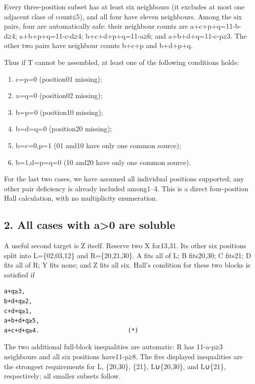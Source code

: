 \documentclass[
  10pt,
]{article}
\providecommand{\tightlist}{%
  \setlength{\itemsep}{0pt}\setlength{\parskip}{0pt}}
\begin{document}
Every three-position subset has at least six neighbours (it excludes at
most one adjacent class of count≤5), and all four have eleven
neighbours. Among the six pairs, four are automatically safe: their
neighbour counts are a+c+p+q=11-b-d≥4; a+b+p+q=11-c-d≥4;
b+c+d+p+q=11-a≥6; and a+b+d+q=11-c-p≥3. The other two pairs have
neighbour counts b+c+p and b+d+p+q.

Thus if T cannot be assembled, at least one of the following conditions
holds:

\begin{enumerate}
\def\labelenumi{\arabic{enumi}.}
\tightlist
\item
  c=p=0 (position01 missing);
\item
  a=q=0 (position02 missing);
\item
  b=p=0 (position10 missing);
\item
  b=d=q=0 (position20 missing);
\item
  b=c=0,p=1 (01 and10 have only one common source);
\item
  b=1,d=p=q=0 (10 and20 have only one common source).
\end{enumerate}

For the last two cases, we have assumed all individual positions
supported; any other pair deficiency is already included among1--4. This
is a direct four-position Hall calculation, with no multiplicity
enumeration.

\hypertarget{all-cases-with-a0-are-soluble}{%
\subsection*{2. All cases with a\textgreater0 are
soluble}\label{all-cases-with-a0-are-soluble}}

A useful second target is Z itself. Reserve two X for13,31. Its other
six positions split into L=\{02,03,12\} and R=\{20,21,30\}. A fits all
of L; B fits20,30; C fits21; D fits all of R; Y fits none; and Z fits
all six. Hall's condition for these two blocks is satisfied if

\begin{verbatim}
a+q≥3,
b+d+q≥2,
c+d+q≥1,
a+b+d+q≥5,
a+c+d+q≥4.                         (*)
\end{verbatim}

The two additional full-block inequalities are automatic: R has 11-a-p≥3
neighbours and all six positions have11-p≥8. The five displayed
inequalities are the strongest requirements for L, \{20,30\}, \{21\},
L∪\{20,30\}, and L∪\{21\}, respectively; all smaller subsets follow.
\end{document}
